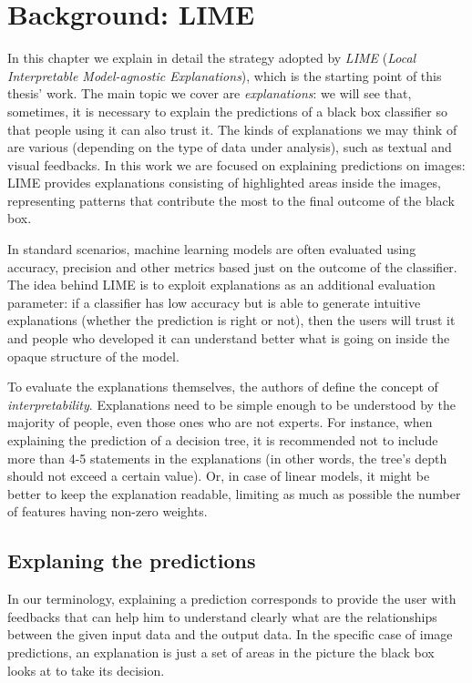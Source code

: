 \documentclass[12pt, twoside, a4paper]{report}
\begin{document}
\chapter{Background: LIME}\label{chapt:background}
In this chapter we explain in detail the strategy adopted by \textit{LIME} (\textit{Local Interpretable Model-agnostic Explanations})\cite{lime}, which is the starting point of this thesis' work. The main topic we cover are \textit{explanations}: we will see that, sometimes, it is necessary to explain the predictions of a black box classifier so that people using it can also trust it. The kinds of explanations we may think of are various (depending on the type of data under analysis), such as textual and visual feedbacks. In this work we are focused on explaining predictions on images: LIME provides explanations consisting of highlighted areas inside the images, representing patterns that contribute the most to the final outcome of the black box. 

In standard scenarios, machine learning models are often evaluated using accuracy, precision and other metrics based just on the outcome of the classifier. 
The idea behind LIME is to exploit explanations as an additional evaluation parameter: if a classifier has low accuracy but is able to generate intuitive explanations (whether the prediction is right or not), then the users will trust it and people who developed it can understand better what is going on inside the opaque structure of the model.

To evaluate the explanations themselves, the authors of \cite{lime} define the concept of \textit{interpretability}. Explanations need to be simple enough to be understood by the majority of people, even those ones who are not experts. For instance, when explaining the prediction of a decision tree, it is recommended not to include more than 4-5 statements in the explanations (in other words, the tree's depth should not exceed a certain value). 
Or, in case of linear models, it might be better to keep the explanation readable, limiting as much as possible the number of features having non-zero weights.

\section{Explaning the predictions}

In our terminology, explaining a prediction corresponds to provide the user with feedbacks that can help him to understand clearly what are the relationships between the given input data and the output data. In the specific case of image predictions, an explanation is just a set of areas in the picture the black box looks at to take its decision. 
\end{document}

